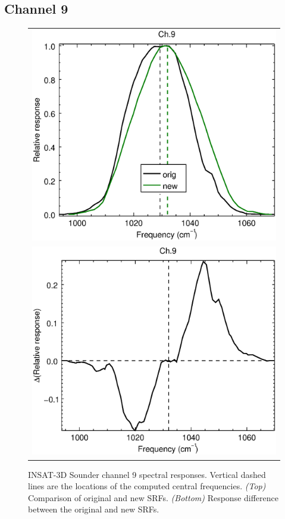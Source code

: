 \subsection{Channel 9}
\begin{figure}[H]
  \centering
  \begin{tabular}{c}
    \includegraphics[scale=0.55]{graphics/sndr/srf/sndr_insat3d-9.eps} \\
    \includegraphics[scale=0.55]{graphics/sndr/srf/sndr_insat3d-9.difference.eps}
  \end{tabular}
  \caption{INSAT-3D Sounder channel 9 spectral responses. Vertical dashed lines are the locations of the computed central frequencies. \emph{(Top)} Comparison of original and new SRFs. \emph{(Bottom)} Response difference between the original and new SRFs.}
  \label{fig:sndr_ch9}
\end{figure}

